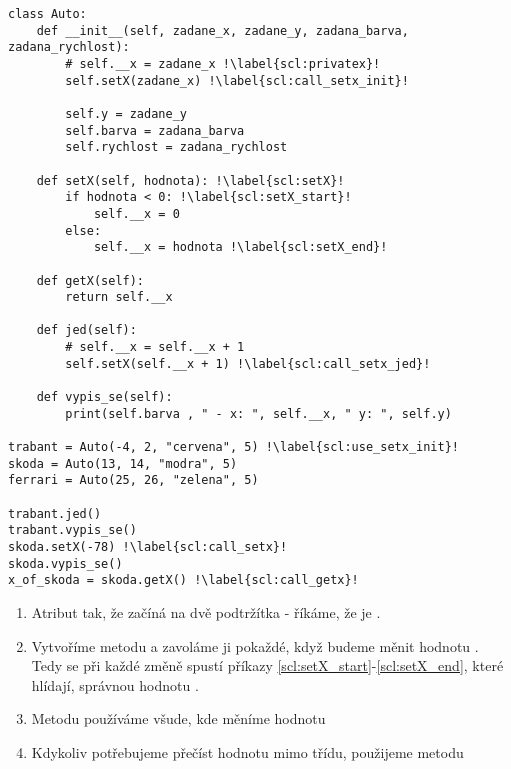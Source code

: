 \begin{minipage}[t]{.45\textwidth}
\begin{code}
\begin{verbatim}
class Auto:
	def __init__(self, zadane_x, zadane_y, zadana_barva, zadana_rychlost):
		# self.__x = zadane_x !\label{scl:privatex}!
		self.setX(zadane_x) !\label{scl:call_setx_init}!
		
		self.y = zadane_y
		self.barva = zadana_barva
		self.rychlost = zadana_rychlost
	
	def setX(self, hodnota): !\label{scl:setX}!
		if hodnota < 0: !\label{scl:setX_start}!
			self.__x = 0
		else:
			self.__x = hodnota !\label{scl:setX_end}!
			
	def getX(self):
		return self.__x
	
	def jed(self):
		# self.__x = self.__x + 1
		self.setX(self.__x + 1) !\label{scl:call_setx_jed}!
		
	def vypis_se(self):
		print(self.barva , " - x: ", self.__x, " y: ", self.y)
		
trabant = Auto(-4, 2, "cervena", 5) !\label{scl:use_setx_init}!
skoda = Auto(13, 14, "modra", 5)
ferrari = Auto(25, 26, "zelena", 5)

trabant.jed()
trabant.vypis_se()
skoda.setX(-78) !\label{scl:call_setx}!
skoda.vypis_se()
x_of_skoda = skoda.getX() !\label{scl:call_getx}!
\end{verbatim}

\label{code:zapouzdreni}
\end{code}
\end{minipage}
\begin{minipage}[t]{.45\textwidth}
\vspace{10cm}
\begin{enumerate}
\item[ř. \ref{scl:privatex}:] Atribut  tak, že začíná na dvě podtržítka - říkáme, že je .
\item[ř. \ref{scl:setX}:] Vytvoříme metodu  a zavoláme ji pokaždé, když budeme měnit hodnotu .\\Tedy se při každé změně spustí příkazy \ref{scl:setX_start}-\ref{scl:setX_end}, které hlídají, správnou hodnotu .
\item[ř. \ref{scl:call_setx_init}, \ref{scl:call_setx_jed}, \ref{scl:call_setx}:] Metodu  používáme všude, kde měníme hodnotu 
\item[\ref{scl:call_getx}:] Kdykoliv potřebujeme přečíst hodnotu  mimo třídu, použijeme metodu 
\end{enumerate}
\end{minipage}

